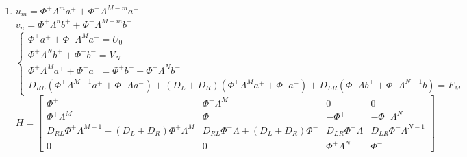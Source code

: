 \documentclass[12pt,a4paper]{article}
\begin{document}
\begin{sol}
\begin{enumerate}
			\item $u_m = \Phi^+ \Lambda^ma^++\Phi^-\Lambda^{M-m}a^-$\\
			$v_n = \Phi^+ \Lambda^nb^++\Phi^-\Lambda^{M-m}b^-$\\
			$\begin{cases}
				\Phi^+ a^+ +  \Phi^-\Lambda^Ma^- = U_0 \\
				\Phi^+ \Lambda^Nb^+ + \Phi^- b^- = V_N \\
				\Phi^+\Lambda^Ma^+ + \Phi^-a^- = \Phi^+b^+ + \Phi^-\Lambda^Nb^- \\
				D_{RL}(\Phi^+ \Lambda^{M-1}a^+ + \Phi^- \Lambda a^-)+(D_L+D_R)(\Phi^+\Lambda^Ma^++\Phi^- a^-)+D_{LR}(\Phi^+\Lambda b^++\Phi^-\Lambda^{N-1}b)=F_M
			\end{cases}$\\
			
			$H = \begin{bmatrix}
				\Phi^+ & \Phi^-\Lambda^M & 0 & 0 \\
				\Phi^+\Lambda^M & \Phi^- & -\Phi^+ & - \Phi^-\Lambda^N \\
				D_{RL}\Phi^+\Lambda^{M-1}+(D_L+D_R)\Phi^+\Lambda^M & D_{RL}\Phi^-\Lambda + (D_L+D_R)\Phi^- & D_{LR}\Phi^+ \Lambda & D_{LR}\Phi^-\Lambda^{N-1} \\
				0 & 0& \Phi^+\Lambda^N & \Phi^-
			\end{bmatrix}$

		\end{enumerate}
	\end{sol}
	
\end{document}
